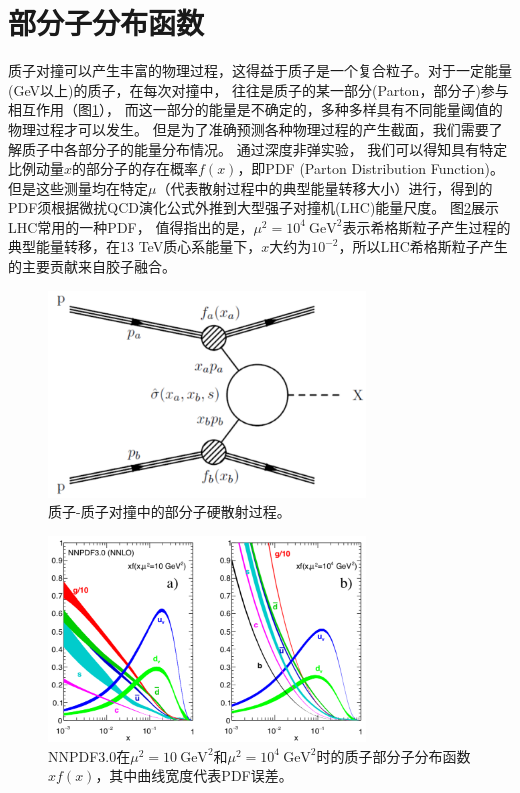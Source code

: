 
\section{部分子分布函数}
质子对撞可以产生丰富的物理过程，这得益于质子是一个复合粒子。对于一定能量(GeV以上)的质子，在每次对撞中，
往往是质子的某一部分(Parton，部分子)参与相互作用（图\ref{fig:pp_collision}），
而这一部分的能量是不确定的，多种多样具有不同能量阈值的物理过程才可以发生。
但是为了准确预测各种物理过程的产生截面，我们需要了解质子中各部分子的能量分布情况。
通过深度非弹实验\cite{Kuhlen:390284}，
我们可以得知具有特定比例动量$x$的部分子的存在概率$f(x)$，即PDF (Parton Distribution Function)。
但是这些测量均在特定$\mu$（代表散射过程中的典型能量转移大小）进行，得到的PDF须根据微扰QCD演化公式\cite{ellis_stirling_webber_1996}外推到大型强子对撞机(LHC)能量尺度。
图\ref{fig:NNPDF3}展示LHC常用的一种PDF，
值得指出的是，$\mu^2=10^4~\text{GeV}^2$表示希格斯粒子产生过程的典型能量转移，在13 TeV质心系能量下，$x$大约为$10^{-2}$，所以LHC希格斯粒子产生的主要贡献来自胶子融合。
\begin{figure}[h]
\centering
 \includegraphics[width=0.75\textwidth]{fig/inclusive_pp.png}
 \caption{质子-质子对撞中的部分子硬散射过程。}
 \label{fig:pp_collision}
\end{figure}
\begin{figure}[h]
\centering
 \includegraphics[width=0.75\textwidth]{fig/NNPDF3.png}
 \caption{NNPDF3.0\cite{Patrignani:2016xqp}在$\mu^2=10~\text{GeV}^2$和$\mu^2=10^4~\text{GeV}^2$时的质子部分子分布函数$xf(x)$，其中曲线宽度代表PDF误差。}
 \label{fig:NNPDF3}
\end{figure}
